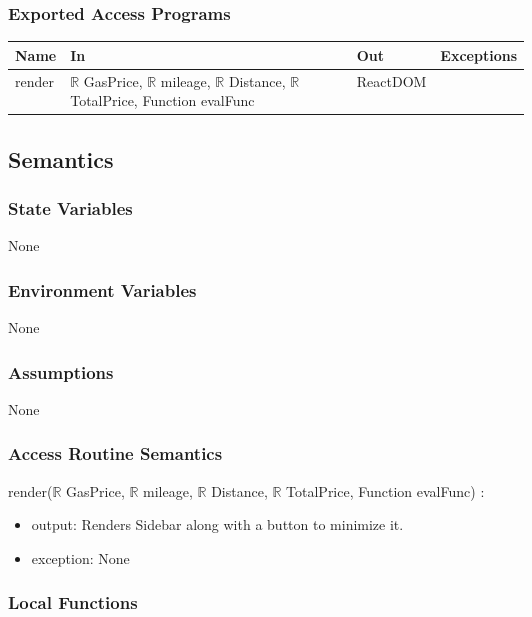 \documentclass[12pt, titlepage]{article}
\begin{document}
\subsubsection{Exported Access Programs}

\begin{tabular}{| l | p{0.6\linewidth}| l | l |}
  \hline
  \textbf{Name} & \textbf{In} & \textbf{Out} & \textbf{Exceptions}\\
  \hline
  render & $\mathbb{R}$ GasPrice, $\mathbb{R}$ mileage, $\mathbb{R}$ Distance, $\mathbb{R}$ TotalPrice, Function evalFunc & ReactDOM & ~\\
  \hline
\end{tabular}

\subsection{Semantics}

\subsubsection{State Variables}

None

\subsubsection{Environment Variables}

None

\subsubsection{Assumptions}

None

\subsubsection{Access Routine Semantics}

\noindent render($\mathbb{R}$ GasPrice, $\mathbb{R}$ mileage, $\mathbb{R}$ Distance, $\mathbb{R}$ TotalPrice, Function evalFunc) :
\begin{itemize}
\item output: Renders Sidebar along with a button to minimize it.
\item exception: None
\end{itemize}

\subsubsection{Local Functions}
\end{document}
